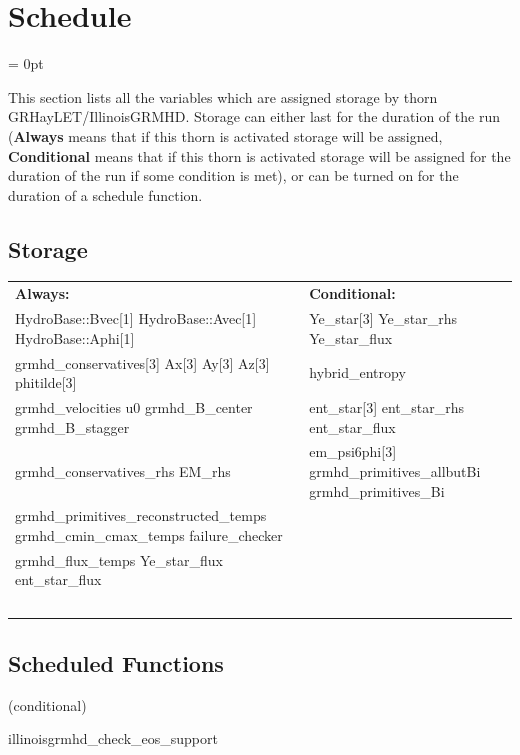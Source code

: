 
\section{Schedule} 


\parskip = 0pt


\noindent This section lists all the variables which are assigned storage by thorn GRHayLET/IllinoisGRMHD.  Storage can either last for the duration of the run ({\bf Always} means that if this thorn is activated storage will be assigned, {\bf Conditional} means that if this thorn is activated storage will be assigned for the duration of the run if some condition is met), or can be turned on for the duration of a schedule function.


\subsection*{Storage}

\hspace{5mm}

 \begin{tabular*}{160mm}{ll} 

{\bf Always:}& {\bf Conditional:} \\ 
 HydroBase::Bvec[1] HydroBase::Avec[1] HydroBase::Aphi[1] &  Ye\_star[3] Ye\_star\_rhs Ye\_star\_flux\\ 
 grmhd\_conservatives[3] Ax[3] Ay[3] Az[3] phitilde[3] &  hybrid\_entropy\\ 
 grmhd\_velocities u0 grmhd\_B\_center grmhd\_B\_stagger &  ent\_star[3] ent\_star\_rhs ent\_star\_flux\\ 
 grmhd\_conservatives\_rhs EM\_rhs &  em\_psi6phi[3] grmhd\_primitives\_allbutBi grmhd\_primitives\_Bi\\ 
 grmhd\_primitives\_reconstructed\_temps grmhd\_cmin\_cmax\_temps failure\_checker & ~\\ 
 grmhd\_flux\_temps Ye\_star\_flux ent\_star\_flux & ~\\ 
~ & ~\\ 
\end{tabular*} 


\subsection*{Scheduled Functions}
\vspace{5mm}

   (conditional) 

\hspace{5mm} illinoisgrmhd\_check\_eos\_support 

